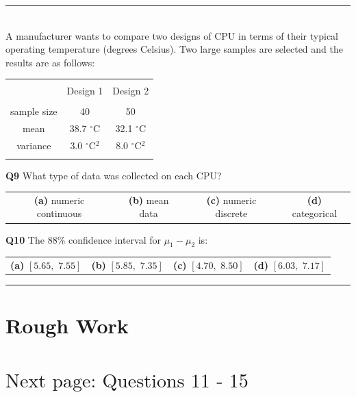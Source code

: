 \documentclass[12pt]{article}
\begin{document}
\rule{\linewidth}{1pt}
\quad\\
A manufacturer wants to compare two designs of CPU in terms of their typical operating temperature (degrees Celsius). Two large samples are selected and the results are as follows:
\begin{small}
\begin{center}
\begin{tabular}{|c|c|c|}
\hline
&&\\[-0.3cm]
& Design 1 & Design 2 \\
\hline
&&\\[-0.2cm]
sample size      & 40 & 50 \\[0.2cm]
mean   & 38.7 $^\circ$C & 32.1 $^\circ$C \\[0.2cm]
variance &  3.0 $^\circ$C$^2$ & 8.0 $^\circ$C$^2$ \\[0.2cm]
\hline
\multicolumn{3}{c}{}
\end{tabular}
\end{center}
\end{small}


{\bf Q9} What type of data was collected on each CPU? \\[0.2cm]
\begin{tabular}{cccc}
{\bf(a)} numeric continuous & {\bf(b)} mean data  & {\bf(c)} numeric discrete & {\bf(d)} categorical \\[0.6cm]
\end{tabular}

{\bf Q10} The 88\% confidence interval for $\mu_1-\mu_2$ is:\\[0.2cm]
\begin{tabular}{cccc}
{\bf(a)} $[5.65,\,\,7.55]$ & {\bf(b)} $[5.85,\,\,7.35]$ & {\bf(c)} $[4.70,\,\,8.50]$ & {\bf(d)} $[6.03,\,\,7.17]$ \\[0.6cm]
\end{tabular}


\rule{\linewidth}{1pt}

\newpage

\section*{Rough Work\\[23cm]}
\section*{\hspace{8cm}$\boxed{\text{Next page: Questions 11 - 15}}$}
\end{document}

